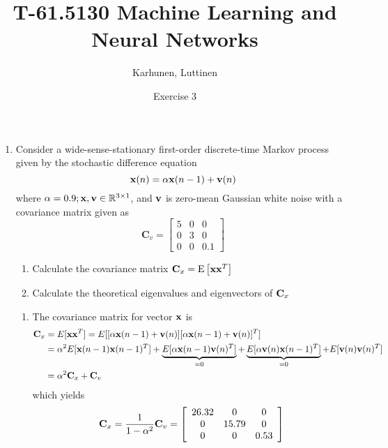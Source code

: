 
\title{T-61.5130 Machine Learning and Neural Networks}
\author{Karhunen, Luttinen}
\date{Exercise 3}





\maketitle

\begin{enumerate}
  
\item Consider a wide-sense-stationary
  first-order discrete-time Markov process given by the stochastic
  difference equation
  \[
  {\bf x}(n) = \alpha {\bf x}(n-1) + {\bf v}(n)
  \]
  where $\alpha = 0.9; {\bf x}, {\bf v} \in \mathbb{R}^{3\times 1}$,
  and ${\bf v}$ is zero-mean Gaussian white noise with a covariance
  matrix given as
  \[ \textbf{C}_v = \left[ \begin{array}{ccc}
      5 & 0 & 0 \\
      0 & 3 & 0 \\
      0 & 0 & 0.1 \end{array} \right]\]

  \begin{enumerate}
  \item Calculate the covariance matrix ${\bf C}_x = \text{E}\left[
      {\bf xx}^T \right]$
  \item Calculate the theoretical eigenvalues and eigenvectors of
    ${\bf C}_x$
  \end{enumerate}
  
  \begin{solution}

    \begin{enumerate}
    \item 
      The covariance matrix for vector $\mathbf{x}$ is
      \[
      \begin{split}
        \mathbf{C}_x &= E[\mathbf{x} \mathbf{x}^T] =
        E[[\alpha\mathbf{x}(n-1)+\mathbf{v}(n)]
        [\alpha\mathbf{x}(n-1)+\mathbf{v}(n)]^T]
        \\
        &=\alpha^2 E[\mathbf{x}(n-1)\mathbf{x}(n-1)^T]+
        \underbrace{E[\alpha \mathbf{x}(n-1)\mathbf{v}(n)^T]}_{=0}+
        \underbrace{E[\alpha \mathbf{v}(n)\mathbf{x}(n-1)^T]}_{=0}+
        E[\mathbf{v}(n)\mathbf{v}(n)^T]
        \\
        &=\alpha^2 \mathbf{C}_x + \mathbf{C}_v
      \end{split}
      \]
      which yields
      \[
      \mathbf{C}_x = \frac{1}{1-\alpha^2}\mathbf{C}_v=
      \left[\begin{array}{ccc}
          26.32 & 0     & 0 \\
          0     & 15.79 & 0 \\
          0     & 0     & 0.53 
        \end{array}\right]
      \]


\end{enumerate}
\end{solution}
\end{enumerate}
